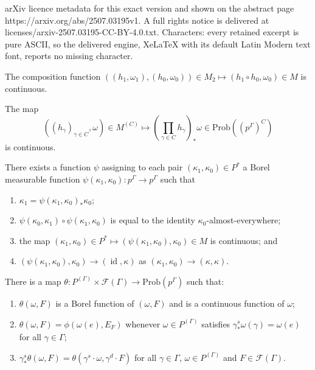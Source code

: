\documentclass[10pt,a4paper]{amsart}
\DeclareMathOperator{\id}{id}
\def\cal{\mathcal}
\newcommand{\Prob}{\mathrm{Prob}}
\begin{document}
arXiv licence metadata for this exact version and shown on the abstract page https://arxiv.org/abs/2507.03195v1. A full rights notice is delivered at licenses/arxiv-2507.03195-CC-BY-4.0.txt. Characters: every retained excerpt is pure ASCII, so the delivered engine, XeLaTeX with its default Latin Modern text font, reports no missing character.
\begin{lem} \label{lem:comp}
	The composition function $((h_1, \omega_1),(h_0,\omega_0)) \in M_2 \mapsto (h_1 \circ h_0, \omega_0) \in M$ is continuous.
\end{lem}

\begin{lem} \label{lem:mfold}
	The map
	\[((h_\gamma)_{\gamma \in C}, \omega) \in M^{(C)} \mapsto \left(\prod_{\gamma \in C} h_\gamma \right)_* \omega \in \Prob((p^\Gamma)^C)\]
	is continuous.
\end{lem}

\begin{lem} \label{lem:pairmap}
	There exists a function $\psi$ assigning to each pair $(\kappa_1, \kappa_0) \in P^*$ a Borel measurable function $\psi(\kappa_1, \kappa_0) : p^\Gamma \rightarrow p^\Gamma$ such that
	\begin{enumerate}
		\item \label{item:pmap1} $\kappa_1 = \psi(\kappa_1, \kappa_0)_* \kappa_0$;
		\item \label{item:pmap2} $\psi(\kappa_0, \kappa_1) \circ \psi(\kappa_1, \kappa_0)$ is equal to the identity $\kappa_0$-almost-everywhere;
		\item \label{item:pmap3} the map $(\kappa_1, \kappa_0) \in P^* \mapsto (\psi(\kappa_1, \kappa_0), \kappa_0) \in M$ is continuous; and
		\item \label{item:pmap4} $(\psi(\kappa_1, \kappa_0), \kappa_0) \rightarrow (\id, \kappa)$ as $(\kappa_1, \kappa_0) \rightarrow (\kappa, \kappa)$.
	\end{enumerate}
\end{lem}

\begin{lem} \label{lem:fmap}
	There is a map $\theta : P^{(\Gamma)} \times \cal F(\Gamma) \rightarrow \Prob(p^\Gamma)$ such that:
	\begin{enumerate}
		\item[(a)] $\theta(\omega, F)$ is a Borel function of $(\omega, F)$ and is a continuous function of $\omega$;
		\item[(b)] $\theta(\omega, F) = \phi(\omega(e), E_F)$ whenever $\omega \in P^{(\Gamma)}$ satisfies $\gamma^s_* \omega(\gamma) = \omega(e)$ for all $\gamma \in \Gamma$;
		\item[(c)] $\gamma^s_* \theta(\omega, F) = \theta(\gamma^s \cdot \omega, \gamma^d \cdot F)$ for all $\gamma \in \Gamma$, $\omega \in P^{(\Gamma)}$ and $F \in \cal F(\Gamma)$.
	\end{enumerate}
\end{lem}
\end{document}
